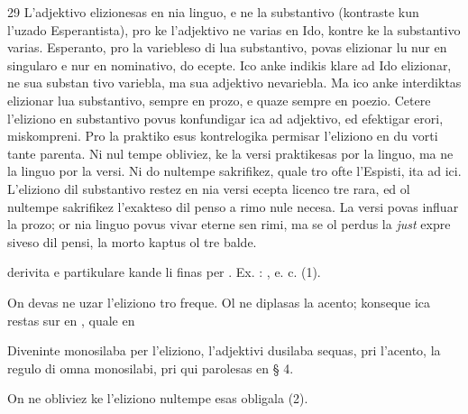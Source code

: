\begin{VUpage}[33]{29}
{L'adjektivo elizionesas en nia linguo, e ne la substantivo (kontraste\nl
kun l'uzado Esperantista), pro ke l'adjektivo ne varias en Ido,\nl
kontre ke la substantivo varias. Esperanto, pro la variebleso di lua\nl
substantivo, povas elizionar lu nur en singularo e nur en nominativo,\nl
do ecepte. Ico anke indikis klare ad Ido elizionar, ne sua substan\cc
tivo variebla, ma sua adjektivo nevariebla. Ma ico anke interdiktas\nl
elizionar lua substantivo, sempre en prozo, e quaze sempre en\nl
poezio. Cetere l'eliziono en substantivo povus konfundigar ica ad\nl
adjektivo, ed efektigar erori, miskompreni. Pro la praktiko esus\nl
kontrelogika permisar l'eliziono en du vorti tante parenta. Ni nul\cc
tempe obliviez, ke la versi praktikesas por la linguo, ma ne la\nl
linguo por la versi. Ni do nultempe sakrifikez, quale tro ofte\nl
l'Espisti, ita ad ici. L'eliziono dil substantivo restez en nia versi\nl
ecepta licenco tre rara, ed ol nultempe sakrifikez l'exakteso dil\nl
penso a rimo nule necesa. La versi povas influar la prozo; or nia\nl
linguo povus vivar eterne sen rimi, ma se ol perdus la \textit{just} expre\cc
siveso dil pensi, la morto kaptus ol tre balde.%
}

\VUcontinue derivita e partikulare kande li finas per . Ex. :\nl
{}, e. c. (1).

On devas ne uzar l'eliziono tro freque. Ol ne diplasas la\nl
acento; konseque ica restas sur  en \cc
{}, quale en 

Diveninte monosilaba per l'eliziono, l'adjektivi dusilaba\nl
sequas, pri l'acento, la regulo di omna monosilabi, pri qui\nl
parolesas en § 4.

On ne obliviez ke l'eliziono nultempe esas obligala (2).
\end{VUpage}

